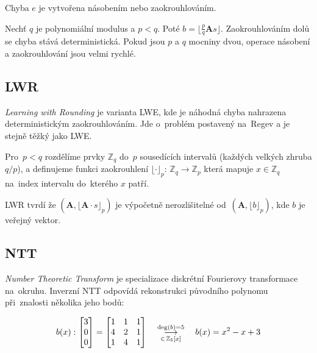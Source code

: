 Chyba $e$ je vytvořena násobením nebo zaokrouhlováním.

Nechť $q$ je polynomiální modulus a $p < q$.
Poté $b = \lfloor \frac{p}{q} \textbf{A}s \rfloor$.
Zaokrouhlováním dolů se chyba stává deterministická.
Pokud jsou $p$ a $q$ mocniny dvou, operace násobení a zaokrouhlování jsou velmi rychlé.


\subsection{LWR}

\emph{Learning with Rounding} je varianta LWE, kde je náhodná chyba nahrazena deterministickým zaokrouhlováním.
Jde o~problém postavený na~Regev a je stejně těžký jako LWE.

Pro~$p < q$ rozdělíme prvky $\mathbb{Z}_q$ do~$p$ sousedících intervalů (každých velkých zhruba $q/p$), a definujeme funkci zaokrouhlení $\lfloor \cdot \rfloor_p$: $\mathbb{Z}_q \rightarrow \mathbb{Z}_p$ která mapuje $x \in \mathbb{Z}_q$ na~index intervalu do~kterého $x$ patří.

LWR tvrdí že $(\textbf{A}, \lfloor \textbf{A} \cdot s \rfloor_p)$ je výpočetně nerozlišitelné od~$(\textbf{A}, \lfloor b \rfloor_p)$, kde $b$ je veřejný vektor.


\subsection{NTT}

\emph{Number Theoretic Transform} je specializace diskrétní Fourierovy transformace na~okruhu.
Inverzní NTT odpovídá rekonstrukci původního polynomu při~znalosti několika jeho bodů:

$$
b(x):
\left[\begin{matrix}
3 \\ 0 \\ 0
\end{matrix}\right] = \left[\begin{matrix}
1 & 1 & 1 \\ 4 & 2 & 1 \\ 1 & 4 & 1 \\
\end{matrix}\right]
\hspace*{1em}
\mathrel{\mathop{\longrightarrow}^{\text{deg}(b)=5}_{\in \, \mathbb{Z}_5[x]}}
\hspace*{1em}
b(x) = x^2 - x + 3
$$

